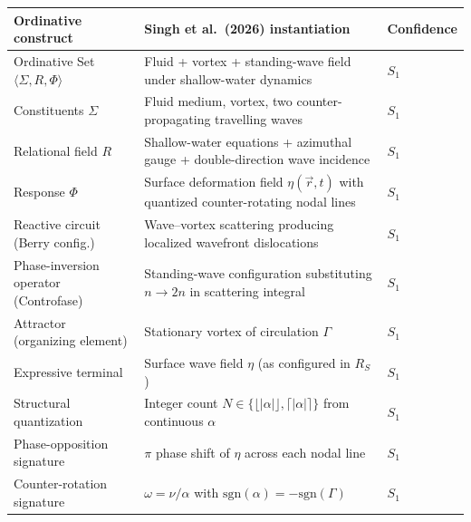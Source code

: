 \documentclass[
  11pt,
  a4paper,
]{article}
\newcounter{none} %
\begin{document}
{\def\LTcaptype{none} %
\begin{longtable}[]{@{}
  >{\raggedright\arraybackslash}p{}
  >{\raggedright\arraybackslash}p{}
  >{\raggedright\arraybackslash}p{}@{}}
\toprule\noalign{}
\begin{minipage}[b]{\linewidth}\raggedright
Ordinative construct
\end{minipage} & \begin{minipage}[b]{\linewidth}\raggedright
Singh et al.~(2026) instantiation
\end{minipage} & \begin{minipage}[b]{\linewidth}\raggedright
Confidence
\end{minipage} \\
\midrule\noalign{}
\endhead
\bottomrule\noalign{}
\endlastfoot
Ordinative Set \(\langle \Sigma, R, \Phi \rangle\) & Fluid + vortex +
standing-wave field under shallow-water dynamics & \(S_1\) \\
Constituents \(\Sigma\) & Fluid medium, vortex, two counter-propagating
travelling waves & \(S_1\) \\
Relational field \(R\) & Shallow-water equations + azimuthal gauge +
double-direction wave incidence & \(S_1\) \\
Response \(\Phi\) & Surface deformation field \(\eta(\vec r, t)\) with
quantized counter-rotating nodal lines & \(S_1\) \\
Reactive circuit (Berry config.) & Wave--vortex scattering producing
localized wavefront dislocations & \(S_1\) \\
Phase-inversion operator (Controfase) & Standing-wave configuration
substituting \(n \to 2n\) in scattering integral & \(S_1\) \\
Attractor (organizing element) & Stationary vortex of circulation
\(\Gamma\) & \(S_1\) \\
Expressive terminal & Surface wave field \(\eta\) (as configured in
\(R_S\)) & \(S_1\) \\
Structural quantization & Integer count
\(N \in \{\lfloor \vert \alpha \vert \rfloor, \lceil \vert \alpha \vert \rceil\}\)
from continuous \(\alpha\) & \(S_1\) \\
Phase-opposition signature & \(\pi\) phase shift of \(\eta\) across each
nodal line & \(S_1\) \\
Counter-rotation signature & \(\omega = \nu/\alpha\) with
\(\mathrm{sgn}(\alpha) = -\mathrm{sgn}(\Gamma)\) & \(S_1\) \\

\end{longtable}}
\end{document}
